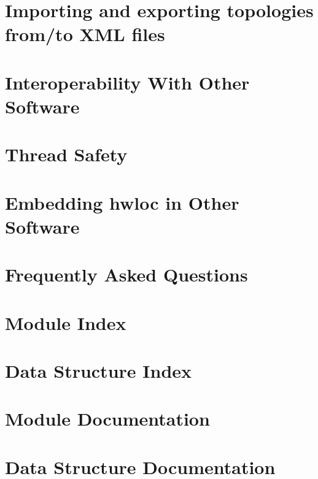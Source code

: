 \documentclass[a4paper]{book}
\begin{document}
\chapter{Importing and exporting topologies from/to XML files}
\label{xml}
\hypertarget{xml}{}

\chapter{Interoperability With Other Software}
\label{interoperability}
\hypertarget{interoperability}{}

\chapter{Thread Safety}
\label{threadsafety}
\hypertarget{threadsafety}{}

\chapter{Embedding hwloc in Other Software}
\label{embed}
\hypertarget{embed}{}

\chapter{Frequently Asked Questions}
\label{faq}
\hypertarget{faq}{}

\chapter{Module Index}

\chapter{Data Structure Index}

\chapter{Module Documentation}





































\chapter{Data Structure Documentation}















\printindex
\end{document}
